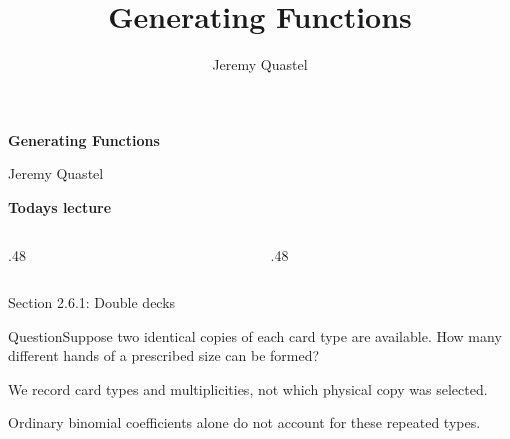 \documentclass[aspectratio=169,11pt]{beamer}
\title{Generating Functions}
\author{Jeremy Quastel}\date{}
\newcommand{\Question}[1]{\begin{block}{Question}#1\end{block}}
\newcommand{\gap}{\par\medskip}
\begin{document}
\begin{frame}[plain]\begin{center}{\Huge\bfseries Generating Functions}\par\vspace{.25cm}{\Large Section 2.6.1--2.6.3}\par{}\par\vspace{.1cm}\par\vspace{.25cm}Jeremy Quastel\end{center}\end{frame}
\begin{frame}[plain]\large \begin{center}{\Huge\bfseries Today\textquotesingle s lecture}\par\vspace{.5cm}\end{center}\begin{columns}[c,onlytextwidth]\begin{column}{.48\textwidth}\end{column}\begin{column}{.48\textwidth}\end{column}\end{columns}\end{frame}
\begin{frame}{Section 2.6.1: Double decks}
\large
\Question{Suppose two identical copies of each card type are available. How many different hands of a prescribed size can be formed?}
\gap We record card types and multiplicities, not which physical copy was selected.
\gap Ordinary binomial coefficients alone do not account for these repeated types.
\end{frame}
\end{document}
